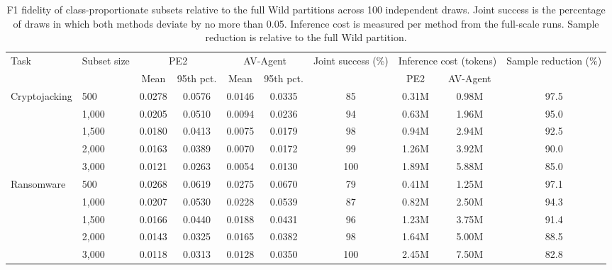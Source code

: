 \begin{table}[t]
\centering
\caption{F1 fidelity of class-proportionate subsets relative to the full Wild partitions across 100 independent draws. Joint success is the percentage of draws in which both methods deviate by no more than 0.05. Inference cost is measured per method from the full-scale runs. Sample reduction is relative to the full Wild partition.}
\label{tab:reprset_fidelity}
\footnotesize
\setlength{\tabcolsep}{4pt}
\renewcommand{\arraystretch}{1.08}
\begin{tabular}{llcccccccc}
\toprule
Task & Subset size
& \multicolumn{2}{c}{PE2}
& \multicolumn{2}{c}{AV-Agent}
& Joint success (\%)
& \multicolumn{2}{c}{Inference cost (tokens)}
& Sample reduction (\%) \\
\cmidrule(lr){3-4}
\cmidrule(lr){5-6}
\cmidrule(lr){8-9}
& & Mean & 95th pct. & Mean & 95th pct. & & PE2 & AV-Agent & \\
\midrule
\multirow{5}{*}{Cryptojacking}
& 500 & 0.0278 & 0.0576 & 0.0146 & 0.0335 & 85 & 0.31M & 0.98M & 97.5 \\
& 1,000 & 0.0205 & 0.0510 & 0.0094 & 0.0236 & 94 & 0.63M & 1.96M & 95.0 \\
& 1,500 & 0.0180 & 0.0413 & 0.0075 & 0.0179 & 98 & 0.94M & 2.94M & 92.5 \\
& 2,000 & 0.0163 & 0.0389 & 0.0070 & 0.0172 & 99 & 1.26M & 3.92M & 90.0 \\
& 3,000 & 0.0121 & 0.0263 & 0.0054 & 0.0130 & 100 & 1.89M & 5.88M & 85.0 \\
\midrule
\multirow{5}{*}{Ransomware}
& 500 & 0.0268 & 0.0619 & 0.0275 & 0.0670 & 79 & 0.41M & 1.25M & 97.1 \\
& 1,000 & 0.0207 & 0.0530 & 0.0228 & 0.0539 & 87 & 0.82M & 2.50M & 94.3 \\
& 1,500 & 0.0166 & 0.0440 & 0.0188 & 0.0431 & 96 & 1.23M & 3.75M & 91.4 \\
& 2,000 & 0.0143 & 0.0325 & 0.0165 & 0.0382 & 98 & 1.64M & 5.00M & 88.5 \\
& 3,000 & 0.0118 & 0.0313 & 0.0128 & 0.0350 & 100 & 2.45M & 7.50M & 82.8 \\
\bottomrule
\end{tabular}
\end{table}
